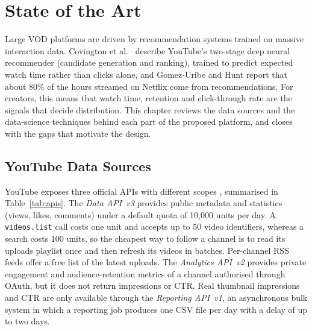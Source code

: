 \chapter{State of the Art}
\label{ch:soa}

Large VOD platforms are driven by recommendation systems trained on massive interaction data. Covington et al.\ \cite{recommender_systems_streaming} describe YouTube's two-stage deep neural recommender (candidate generation and ranking), trained to predict expected watch time rather than clicks alone, and Gomez-Uribe and Hunt \cite{vod_bigdata} report that about 80\% of the hours streamed on Netflix come from recommendations. For creators, this means that watch time, retention and click-through rate are the signals that decide distribution. This chapter reviews the data sources and the data-science techniques behind each part of the proposed platform, and closes with the gaps that motivate the design.

\section{YouTube Data Sources}

YouTube exposes three official APIs with different scopes \cite{yt_data_api}, summarised in Table~\ref{tab:apis}. The \textit{Data API~v3} provides public metadata and statistics (views, likes, comments) under a default quota of 10{,}000 units per day. A \texttt{videos.list} call costs one unit and accepts up to 50 video identifiers, whereas a search costs 100 units, so the cheapest way to follow a channel is to read its uploads playlist once and then refresh its videos in batches. Per-channel RSS feeds offer a free list of the latest uploads. The \textit{Analytics API~v2} provides private engagement and audience-retention metrics of a channel authorised through OAuth, but it does not return impressions or CTR. Real thumbnail impressions and CTR are only available through the \textit{Reporting API~v1}, an asynchronous bulk system in which a reporting job produces one CSV file per day with a delay of up to two days.

